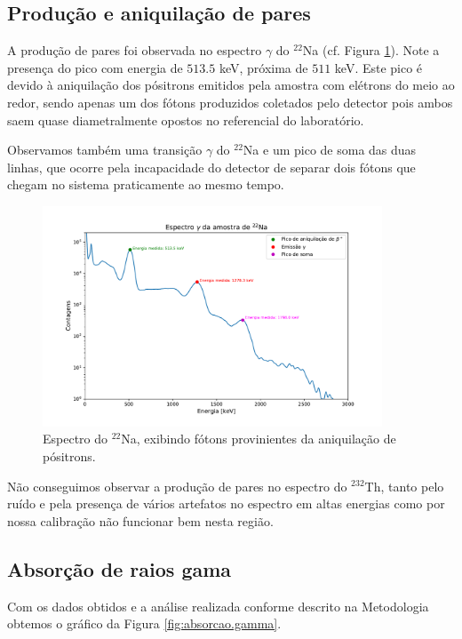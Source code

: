 \documentclass[a4paper, 11pt, notitlepage]{article}
\numberwithin{equation}{section}  %
\begin{document}
\subsection{Produção e aniquilação de pares}

A produção de pares foi observada no espectro $\gamma$ do ${}^{22}$Na (cf. Figura \ref{fig:espectro.na}). Note a presença do pico com energia de $513.5$ keV, próxima de $511$ keV. Este pico é devido à aniquilação dos pósitrons emitidos pela amostra com elétrons do meio ao redor, sendo apenas um dos fótons produzidos coletados pelo detector pois ambos saem quase diametralmente opostos no referencial do laboratório. 

Observamos também uma transição $\gamma$ do ${}^{22}$Na e um pico de soma das duas linhas, que ocorre pela incapacidade do detector de separar dois fótons que chegam no sistema praticamente ao mesmo tempo.

\begin{figure}[H]
  \centering
  \includegraphics[width=0.9\textwidth]{na22}
  \caption{Espectro do ${}^{22}$Na, exibindo fótons provinientes da aniquilação de pósitrons.}
  \label{fig:espectro.na}
\end{figure}

Não conseguimos observar a produção de pares no espectro do ${}^{232}$Th, tanto pelo ruído e pela presença de vários artefatos no espectro em altas energias como por nossa calibração não funcionar bem nesta região.

\subsection{Absorção de raios gama}

Com os dados obtidos e a análise realizada conforme descrito na Metodologia obtemos o gráfico da Figura \ref{fig:absorcao.gamma}.
\end{document}
